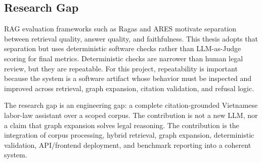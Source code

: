 \subsection{Research Gap}
RAG evaluation frameworks such as Ragas \cite{es2023ragas} and ARES \cite{saadfalcon2023ares} motivate separation between retrieval quality, answer quality, and faithfulness. This thesis adopts that separation but uses deterministic software checks rather than LLM-as-Judge scoring for final metrics. Deterministic checks are narrower than human legal review, but they are repeatable. For this project, repeatability is important because the system is a software artifact whose behavior must be inspected and improved across retrieval, graph expansion, citation validation, and refusal logic.

The research gap is an engineering gap: a complete citation-grounded Vietnamese labor-law assistant over a scoped corpus. The contribution is not a new LLM, nor a claim that graph expansion solves legal reasoning. The contribution is the integration of corpus processing, hybrid retrieval, graph expansion, deterministic validation, API/frontend deployment, and benchmark reporting into a coherent system.
